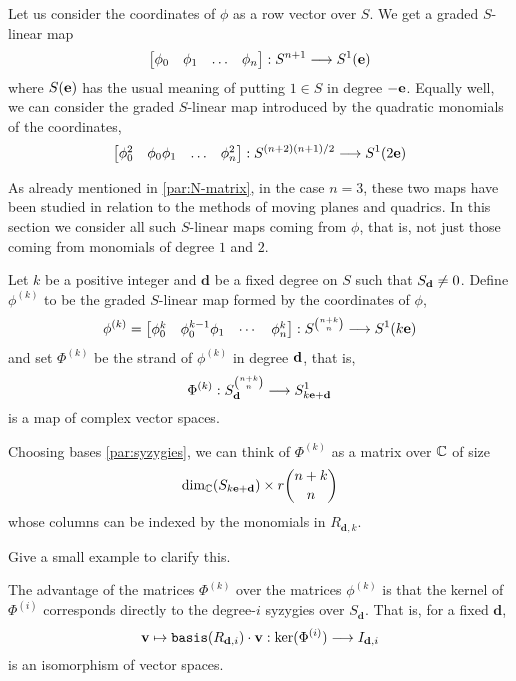 \documentclass[fleqn,reqno]{amsart}
\numberwithin{first}{chapter}
\begin{document}
\begin{paragraf}
\label{par:all-phi-k}
Let us consider the coordinates of $\phi$ as a row vector over $S$. We get a graded $S$-linear map
\[
\begin{bmatrix}
	\phi_0& \phi_1& \ldots& \phi_n
\end{bmatrix}:S^{n+1}\longrightarrow S^1(\mathbf e)
\]
where $S(\mathbf e)$ has the usual meaning of putting $1\in S$ in degree $-\mathbf e$.
Equally well, we can consider the graded $S$-linear map introduced by the quadratic monomials
of the coordinates,
\[
\begin{bmatrix}
	\phi_0^2& \phi_0\phi_1& \ldots& \phi_n^2
\end{bmatrix}:S^{(n+2)(n+1)/2}\longrightarrow S^1(2\mathbf e)
\]

As already mentioned in \eqref{par:N-matrix}, in the case $n=3$,
these two maps have been studied in relation to the methods of moving planes and quadrics.
In this section we consider all such $S$-linear maps coming from $\phi$,
that is, not just those coming from monomials of degree $1$ and $2$.
\end{paragraf}

\begin{paragraf}
\label{par:strands}
Let $k$ be a positive integer and $\mathbf d$ be a fixed degree on $S$ such that $S_\mathbf d\neq0$.
Define $\phi^{(k)}$ to be the graded $S$-linear map formed by the coordinates of $\phi$,
\[
\phi^{(k)}=\begin{bmatrix}\phi_0^k& \phi_0^{k-1}\phi_1& \cdots& \phi_n^k\end{bmatrix}:
S^{\binom{n+k}{n}}\longrightarrow S^1(k\mathbf e)
\]
and set $\Phi^{(k)}$ be the strand of $\phi^{(k)}$ in degree $\mathbf d$, that is,
\[
\Phi^{(k)}:S_{\mathbf d}^{\binom{n+k}{n}}\longrightarrow S_{k\mathbf e+\mathbf d}^1
\]
is a map of complex vector spaces.

Choosing bases \eqref{par:syzygies}, we can think of $\Phi^{(k)}$ as a matrix over $\mathbb{C}$ of size
\[
\dim_{\mathbb{C}}(S_{k\mathbf e+\mathbf d})\times r\binom{n+k}{n}
\]
whose columns can be indexed by the monomials in $R_{\mathbf d,k}$.
\end{paragraf}

\begin{example}
Give a small example to clarify this.
\end{example}

\begin{paragraf}
\label{par:syzygies-kernel}
The advantage of the matrices $\Phi^{(k)}$ over the matrices $\phi^{(k)}$
is that the kernel of $\Phi^{(i)}$ corresponds directly to the degree-$i$ syzygies over $S_{\mathbf d}$.
That is, for a fixed $\mathbf d$,
\[
\mathbf v\mapsto\mathop{\tt basis}(R_{\mathbf d,i})\cdot \mathbf v:\ker(\Phi^{(i)})\longrightarrow I_{\mathbf d, i}
\]
is an isomorphism of vector spaces.
\end{paragraf}
\end{document}
